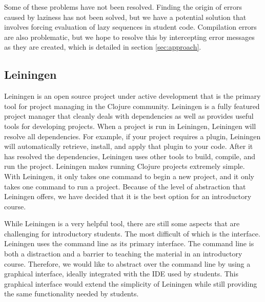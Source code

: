 \documentclass[12pt]{article}
\begin{document}
Some of these problems have not been resolved. Finding the origin of errors caused by laziness has not been solved, but we have a potential solution that involves forcing evaluation of lazy sequences in student code. Compilation errors are also problematic, but we hope to resolve this by intercepting error messages as they are created, which is detailed in section \ref{sec:approach}.


 
\subsection{Leiningen}
Leiningen is an open source project under active development that is the primary tool for project managing in the Clojure community\cite{LeinGitHub}. Leiningen is a fully featured project manager that cleanly deals with dependencies as well as provides useful tools for developing projects. When a project is run in Leiningen, Leiningen will resolve all dependencies. For example, if your project requires a plugin, Leiningen will automatically retrieve, install, and apply that plugin to your code. After it has resolved the dependencies, Leiningen uses other tools to build, compile, and run the project. Leiningen makes running Clojure projects extremely simple. With Leiningen, it only takes one command to begin a new project, and it only takes one command to run a project. Because of the level of abstraction that Leiningen offers, we have decided that it is the best option for an introductory course.

While Leiningen is a very helpful tool, there are still some aspects that are challenging for introductory students. The most difficult of which is the interface. Leiningen uses the command line as its primary interface. The command line is both a distraction and a barrier to teaching the material in an introductory course. Therefore, we would like to abstract over the command line by using a graphical interface, ideally integrated with the IDE used by students. This graphical interface would extend the simplicity of Leiningen while still providing the same functionality needed by students.
\end{document}
